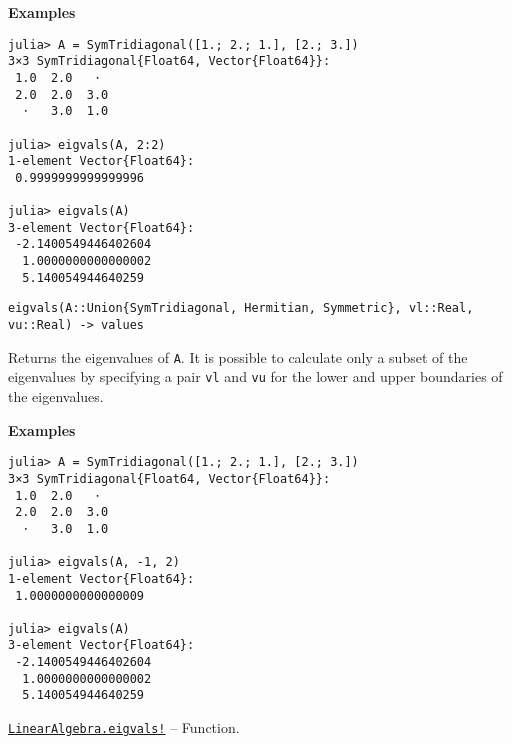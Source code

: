 \begin{adjustwidth}{2em}{0pt}
\textbf{Examples}


\begin{verbatim}
julia> A = SymTridiagonal([1.; 2.; 1.], [2.; 3.])
3×3 SymTridiagonal{Float64, Vector{Float64}}:
 1.0  2.0   ⋅
 2.0  2.0  3.0
  ⋅   3.0  1.0

julia> eigvals(A, 2:2)
1-element Vector{Float64}:
 0.9999999999999996

julia> eigvals(A)
3-element Vector{Float64}:
 -2.1400549446402604
  1.0000000000000002
  5.140054944640259
\end{verbatim}




\begin{lstlisting}
eigvals(A::Union{SymTridiagonal, Hermitian, Symmetric}, vl::Real, vu::Real) -> values
\end{lstlisting}

Returns the eigenvalues of \texttt{A}. It is possible to calculate only a subset of the eigenvalues by specifying a pair \texttt{vl} and \texttt{vu} for the lower and upper boundaries of the eigenvalues.

\textbf{Examples}


\begin{verbatim}
julia> A = SymTridiagonal([1.; 2.; 1.], [2.; 3.])
3×3 SymTridiagonal{Float64, Vector{Float64}}:
 1.0  2.0   ⋅
 2.0  2.0  3.0
  ⋅   3.0  1.0

julia> eigvals(A, -1, 2)
1-element Vector{Float64}:
 1.0000000000000009

julia> eigvals(A)
3-element Vector{Float64}:
 -2.1400549446402604
  1.0000000000000002
  5.140054944640259
\end{verbatim}



\end{adjustwidth}
\hypertarget{10264430947938868113}{}
\hyperlink{10264430947938868113}{\texttt{LinearAlgebra.eigvals!}}  -- {Function.}

